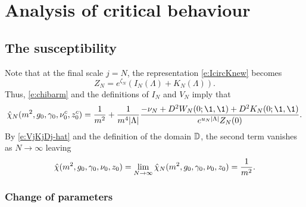 \chapter{Analysis of critical behaviour}


\section{The susceptibility}

Note that at the final scale $j = N$, the representation \eqref{e:IcircKnew}
becomes
\begin{equation}
\label{e:ZNINKN}
Z_N = e^{\zeta_N} (I_N(\Lambda) + K_N(\Lambda)).
\end{equation}
Thus, \eqref{e:chibarm} and the definitions of $I_N$ and $V_N$ imply that
\begin{equation}
\hat\chi_N(m^2, \gcc_0, \gamma_0, \nu_0^c, z_0^c)
	=
\frac{1}{m^2}
	+
\frac{1}{m^4 |\Lambda|}
\frac{-\nu_N + D^2 W_N(0; \1, \1) + D^2 K_N(0; \1, \1)}{e^{u_N |\Lambda|} Z_N(0)}.
\end{equation}
By \eqref{e:VjKjDj-hat} and the definition of the domain $\mathbb{D}$, the second term
vanishes as $N\to\infty$ leaving
\begin{equation}
\label{e:chi-m-hat}
\hat\chi(m^2, g_0, \gamma_0, \nu_0, z_0)
	=
\lim_{N\rightarrow\infty} \hat\chi_N(m^2, g_0, \gamma_0, \nu_0, z_0)
	=
\frac{1}{m^2}.
\end{equation}


\subsection{Change of parameters}
\label{sec:nuztilde}

